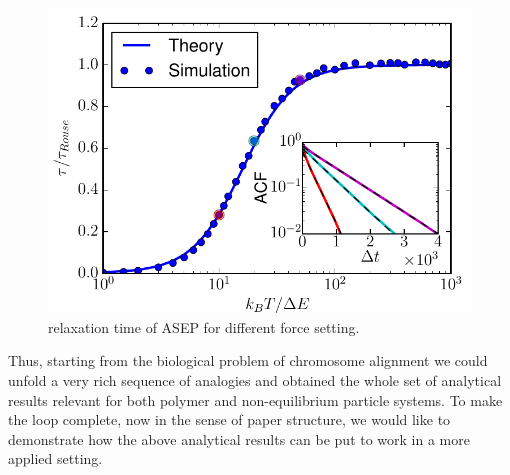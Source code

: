 \documentclass[aps,showpacs,twocolumn,floatfix,prx,superscriptaddress]{revtex4-1}
\begin{document}
\begin{figure}[htpb]
   \centering
   \includegraphics[width=1.0\linewidth]{relaxation1D}
   \caption{relaxation time of ASEP for different force setting.}
   \label{fig:relaxation1D}
\end{figure}



%
%
%
%
%
%
%


Thus, starting from the biological problem of chromosome alignment we could unfold a very rich sequence of analogies and obtained the whole set of analytical results relevant for both polymer and non-equilibrium particle systems. To make the loop complete, now in the sense of paper structure, we would like to demonstrate how the above analytical results can be put to work in a more applied setting.
\end{document}
